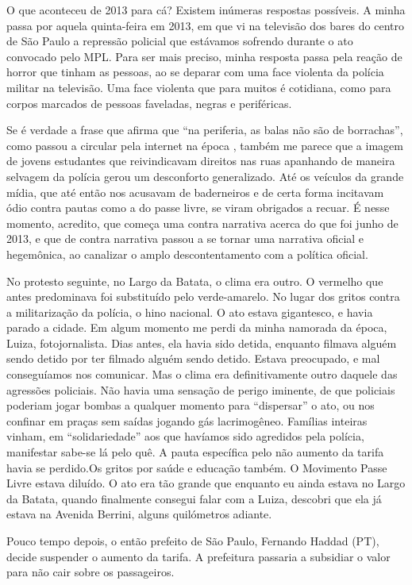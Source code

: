 O que aconteceu de 2013 para cá? Existem inúmeras respostas possíveis. A
minha passa por aquela quinta-feira em 2013, em que vi na televisão dos
bares do centro de São Paulo a repressão policial que estávamos sofrendo
durante o ato convocado pelo MPL. Para ser mais preciso, minha resposta
passa pela reação de horror que tinham as pessoas, ao se deparar com uma
face violenta da polícia militar na televisão. Uma face violenta que
para muitos é cotidiana, como para corpos marcados de pessoas faveladas,
negras e periféricas.

Se é verdade a frase que afirma que ``na periferia, as balas não são de
borrachas'', como passou a circular pela internet na época , também me
parece que a imagem de jovens estudantes que reivindicavam direitos nas
ruas apanhando de maneira selvagem da polícia gerou um desconforto
generalizado. Até os veículos da grande mídia, que até então nos
acusavam de baderneiros e de certa forma incitavam ódio contra pautas
como a do passe livre, se viram obrigados a recuar. É nesse momento,
acredito, que começa uma contra narrativa acerca do que foi junho de
2013, e que de contra narrativa passou a se tornar uma narrativa oficial
e hegemônica, ao canalizar o amplo descontentamento com a política
oficial.

No protesto seguinte, no Largo da Batata, o clima era outro. O vermelho
que antes predominava foi substituído pelo verde-amarelo. No lugar dos
gritos contra a militarização da polícia, o hino nacional. O ato estava
gigantesco, e havia parado a cidade. Em algum momento me perdi da minha
namorada da época, Luiza, fotojornalista. Dias antes, ela havia sido
detida, enquanto filmava alguém sendo detido por ter filmado alguém
sendo detido. Estava preocupado, e mal conseguíamos nos comunicar. Mas o
clima era definitivamente outro daquele das agressões policiais. Não
havia uma sensação de perigo iminente, de que policiais poderiam jogar
bombas a qualquer momento para ``dispersar'' o ato, ou nos confinar em
praças sem saídas jogando gás lacrimogêneo. Famílias inteiras vinham, em
``solidariedade'' aos que havíamos sido agredidos pela polícia,
manifestar sabe-se lá pelo quê. A pauta específica pelo não aumento da
tarifa havia se perdido.Os gritos por saúde e educação também. O
Movimento Passe Livre estava diluído. O ato era tão grande que enquanto
eu ainda estava no Largo da Batata, quando finalmente consegui falar com
a Luiza, descobri que ela já estava na Avenida Berrini, alguns
quilómetros adiante.

Pouco tempo depois, o então prefeito de São Paulo, Fernando Haddad (PT),
decide suspender o aumento da tarifa. A prefeitura passaria a subsidiar
o valor para não cair sobre os passageiros.

